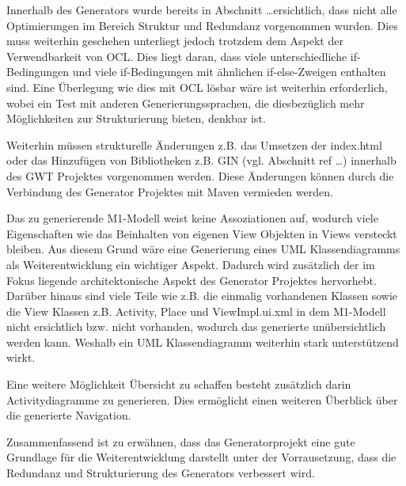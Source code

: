 Innerhalb des Generators wurde bereits in Abschnitt \ldots ersichtlich, dass
nicht alle Optimierungen im Bereich Struktur und Redundanz vorgenommen wurden.
Dies muss weiterhin geschehen unterliegt jedoch trotzdem dem Aspekt der
Verwendbarkeit von OCL. Dies liegt daran, dass viele
unterschiedliche if-Bedingungen und viele if-Bedingungen mit ähnlichen
if-else-Zweigen enthalten sind. Eine Überlegung wie dies mit OCL lösbar wäre
ist weiterhin erforderlich, wobei ein Test mit anderen Generierungssprachen,
die diesbezüglich mehr Möglichkeiten zur Strukturierung bieten, denkbar ist.

Weiterhin müssen strukturelle Änderungen z.B. das Umsetzen der
index.html oder das Hinzufügen von Bibliotheken z.B. GIN (vgl. Abschnitt ref
\ldots) innerhalb des GWT Projektes vorgenommen werden. Diese Änderungen können
durch die Verbindung des Generator Projektes mit Maven vermieden werden.

Das zu generierende M1-Modell weist keine Assoziationen auf, wodurch viele
Eigenschaften wie das Beinhalten von eigenen View Objekten in Views versteckt
bleiben. Aus diesem Grund wäre eine Generierung eines UML Klassendiagramms als
Weiterentwicklung ein wichtiger Aspekt. Dadurch wird zusätzlich der im Fokus
liegende architektonische Aspekt des Generator Projektes hervorhebt. Darüber
hinaus sind viele Teile wie z.B. die einmalig vorhandenen Klassen sowie die View
Klassen z.B. Activity, Place und ViewImpl.ui.xml in dem M1-Modell nicht
ersichtlich bzw. nicht vorhanden, wodurch das generierte unübersichtlich werden
kann. Weshalb ein UML Klassendiagramm weiterhin stark unterstützend wirkt. 

Eine weitere Möglichkeit Übersicht zu schaffen besteht zusätzlich darin
Activitydiagramme zu generieren. Dies ermöglicht einen weiteren Überblick über
die generierte Navigation.

Zusammenfassend ist zu erwähnen, dass das Generatorprojekt eine gute
Grundlage für die Weiterentwicklung darstellt unter der Vorrausetzung, dass die
Redundanz und Strukturierung des Generators verbessert wird.